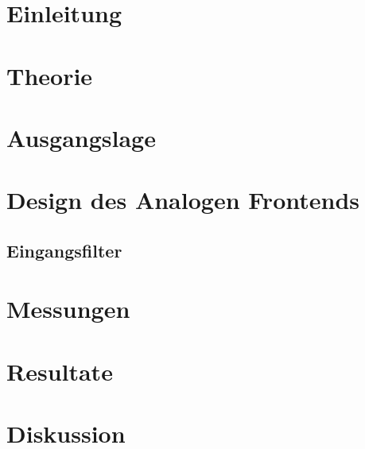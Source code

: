 \documentclass{fhnwreport} %
\begin{document}
\section{Einleitung}
\label{sec:motivation}
\label{sec:einleitung}


\clearpage

\section{Theorie}
\label{sec:sdr}


\clearpage

\section{Ausgangslage}
\label{sec:ausgangslage}


\clearpage

\section{Design des Analogen Frontends}
\label{sec:afe}

\subsection{Eingangsfilter}
\label{sec:filter}


\clearpage

\section{Messungen}
\label{sec:messungen}


\clearpage

\section{Resultate}
\label{sec:resultate}


\clearpage

\section{Diskussion}
\label{sec:diskussion}

\end{document}
